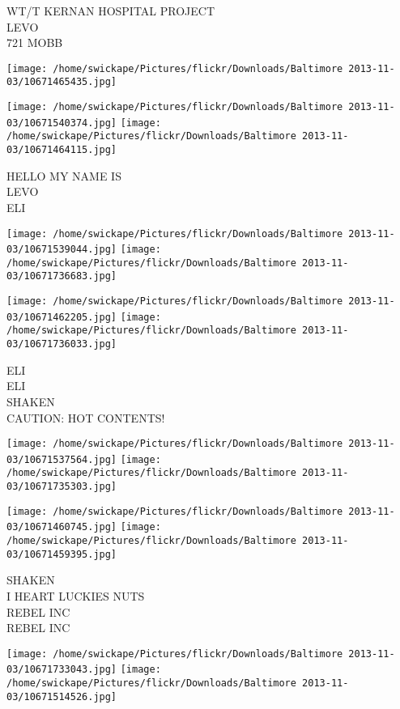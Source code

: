 \documentclass[10pt,letterpaper]{article}
\begin{document}
WT/T KERNAN HOSPITAL PROJECT\\
LEVO\\
721 MOBB\\
\pagebreak

\texttt{[image: /home/swickape/Pictures/flickr/Downloads/Baltimore 2013-11-03/10671465435.jpg]}

\vspace{0.25in}
\texttt{[image: /home/swickape/Pictures/flickr/Downloads/Baltimore 2013-11-03/10671540374.jpg]}
\texttt{[image: /home/swickape/Pictures/flickr/Downloads/Baltimore 2013-11-03/10671464115.jpg]}

HELLO MY NAME IS\\
LEVO\\
ELI\\
\pagebreak

\texttt{[image: /home/swickape/Pictures/flickr/Downloads/Baltimore 2013-11-03/10671539044.jpg]}
\texttt{[image: /home/swickape/Pictures/flickr/Downloads/Baltimore 2013-11-03/10671736683.jpg]}

\texttt{[image: /home/swickape/Pictures/flickr/Downloads/Baltimore 2013-11-03/10671462205.jpg]}
\texttt{[image: /home/swickape/Pictures/flickr/Downloads/Baltimore 2013-11-03/10671736033.jpg]}

ELI\\
ELI\\
SHAKEN\\
CAUTION: HOT CONTENTS!\\
\pagebreak

\texttt{[image: /home/swickape/Pictures/flickr/Downloads/Baltimore 2013-11-03/10671537564.jpg]}
\texttt{[image: /home/swickape/Pictures/flickr/Downloads/Baltimore 2013-11-03/10671735303.jpg]}

\texttt{[image: /home/swickape/Pictures/flickr/Downloads/Baltimore 2013-11-03/10671460745.jpg]}
\texttt{[image: /home/swickape/Pictures/flickr/Downloads/Baltimore 2013-11-03/10671459395.jpg]}

SHAKEN\\
I HEART LUCKIES NUTS\\
REBEL INC\\
REBEL INC\\
\pagebreak

\texttt{[image: /home/swickape/Pictures/flickr/Downloads/Baltimore 2013-11-03/10671733043.jpg]}
\texttt{[image: /home/swickape/Pictures/flickr/Downloads/Baltimore 2013-11-03/10671514526.jpg]}
\end{document}
